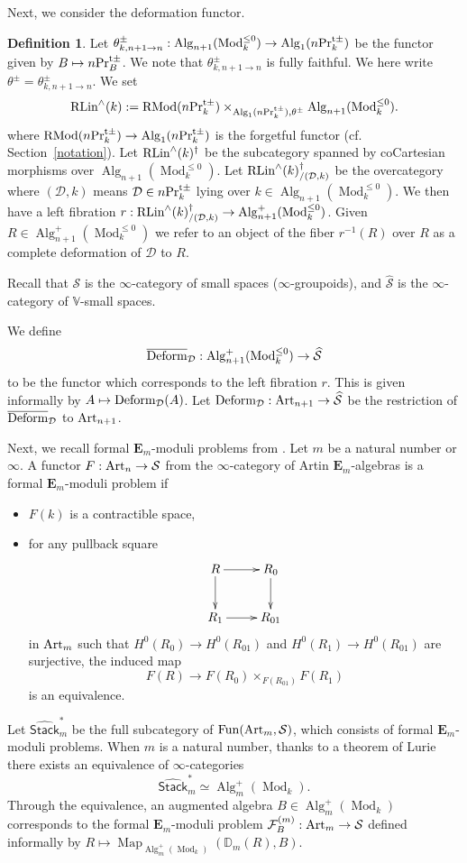 \documentclass[leqno,12pt]{amsart}
\theoremstyle{plain}
\theoremstyle{definition}
\newtheorem{Definition}[Theorem]{Definition}
\newcommand{\DD}{\mathbb{D}}
\newcommand{\DDD}{\mathcal{D}}
\newcommand{\PRTTT}{\textup{Pr}^{\textup{t}\pm}}
\newcommand{\Mod}{\operatorname{Mod}}
\newcommand{\SSS}{\mathcal{S}}
\newcommand{\wSSS}{\widehat{\mathcal{S}}}
\newcommand{\Map}{\operatorname{Map}}
\newcommand{\Fun}{\operatorname{Fun}}
\newcommand{\Alg}{\operatorname{Alg}}
\newcommand{\RMod}{\operatorname{RMod}}
\begin{document}
Next, we consider the deformation functor.


\begin{Definition}
\label{deffunctorcomplete}
Let 
$\theta_{k,n+1\to n}^\pm:\Alg_{n+1}(\Mod_k^{\le0})\to \Alg_1(n\PRTTT_k)$ be the functor given by $B\mapsto n\PRTTT_B$.
We note that $\theta_{k,n+1\to n}^\pm$ is fully faithful. We here write $\theta^\pm=\theta_{k,n+1\to n}^\pm$.
We set
\[
\textup{RLin}^{\wedge}(k):=\RMod(n\PRTTT_k)\times_{\Alg_1(n\PRTTT_k),\theta^\pm}\Alg_{n+1}(\Mod_k^{\le0}).
\]
where $\RMod(n\PRTTT_k)\to \Alg_1(n\PRTTT_k)$ is the forgetful functor (cf. Section~\ref{notation}).
Let
 $\textup{RLin}^\wedge(k)^\dagger$ be the subcategory spanned by coCartesian morphisms over $\Alg_{n+1}(\Mod_k^{\le0})$.
Let
$\textup{RLin}^\wedge(k)_{/(\DDD,k)}^\dagger$
be the overcategory where $(\DDD,k)$ means $\DDD\in n\PRTTT_k$ lying over $k\in \Alg_{n+1}(\Mod_k^{\le0})$.
We then have a left fibration $r:\textup{RLin}^\wedge(k)_{/(\DDD,k)}^\dagger\to \Alg_{n+1}^+(\Mod_k^{\le0})$.
Given $R\in \Alg_{n+1}^+(\Mod_k^{\le0})$ we refer to an object of the fiber $r^{-1}(R)$ over $R$ as a complete deformation of $\DDD$ to $R$. 


Recall that $\SSS$ is the $\infty$-category of small spaces ($\infty$-groupoids),
 and $\wSSS$ is the $\infty$-category of $\mathbb{V}$-small spaces.

We define 
\[
\overline{\textup{Deform}}_{\DDD}:\Alg_{n+1}^+(\Mod_k^{\le0})\to \wSSS
\]
to be the functor which corresponds to the left fibration $r$. This is given informally by $A\mapsto \textup{Deform}_{\DDD}(A)$.
Let $\textup{Deform}_{\DDD}:\textup{Art}_{n+1}\to \wSSS$ be the restriction of $\overline{\textup{Deform}}_{\DDD}$ to $\textup{Art}_{n+1}$.
\end{Definition}



Next, we recall formal $\mathbf{E}_m$-moduli problems from \cite[Section 4]{DAG}.
Let $m$ be a natural number or $\infty$.
A functor $F:\textup{Art}_n\to \SSS$ from the $\infty$-category of Artin $\mathbf{E}_m$-algebras is a formal $\mathbf{E}_m$-moduli problem if
\begin{itemize}
  \item $F(k)$ is a contractible space,
\item for any pullback square \[
\xymatrix{
R \ar[r] \ar[d] &  R_0 \ar[d] \\
R_1 \ar[r] & R_{01}
}
\]
in $\textup{Art}_m$
such that $H^0(R_0)\to H^0(R_{01})$ and $H^0(R_1)\to H^0(R_{01})$ are surjective, the induced map
 \[
F(R) \to  F(R_0)  \times_{F(R_{01})}F(R_1)
\]
is an equivalence.
\end{itemize}
Let $\widehat{\mathsf{Stack}}_m^\ast$ be the full subcategory of $\Fun(\textup{Art}_m, \SSS)$, which consists of formal $\mathbf{E}_m$-moduli problems.
When $m$ is a natural number, thanks to a theorem of Lurie \cite[X, Theorem 4.0.8]{DAG} there exists an equivalence of $\infty$-categories
\[
\widehat{\mathsf{Stack}}_m^\ast \simeq \Alg_m^+(\Mod_k).
\]
Through the equivalence,
an augmented algebra $B\in \Alg_m^+(\Mod_k)$ corresponds to the formal $\mathbf{E}_m$-moduli problem $\mathcal{F}_{B}^{(m)}: \textup{Art}_m\to  \SSS$
defined informally by $R \mapsto \Map_{\Alg_m^+(\Mod_k)}(\DD_m(R),B)$.
\end{document}
